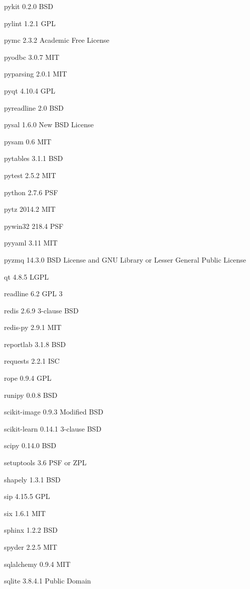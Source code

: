 \documentclass[letterpaper,10pt,openany,oneside]{sphinxmanual}
\begin{document}
\begin{DUlineblock}{0em}
\item[] pykit         0.2.0   BSD
\item[] pylint        1.2.1   GPL
\item[] pymc  2.3.2   Academic Free License
\item[] pyodbc        3.0.7   MIT
\item[] pyparsing     2.0.1   MIT
\item[] pyqt  4.10.4  GPL
\item[] pyreadline    2.0     BSD
\item[] pysal         1.6.0   New BSD License
\item[] pysam         0.6     MIT
\item[] pytables      3.1.1   BSD
\item[] pytest        2.5.2   MIT
\item[] python        2.7.6   PSF
\item[] pytz  2014.2  MIT
\item[] pywin32       218.4   PSF
\item[] pyyaml        3.11    MIT
\item[] pyzmq         14.3.0  BSD License and GNU Library or Lesser General Public License
\item[] qt    4.8.5   LGPL
\item[] readline      6.2     GPL 3
\item[] redis         2.6.9   3-clause BSD
\item[] redis-py      2.9.1   MIT
\item[] reportlab     3.1.8   BSD
\item[] requests      2.2.1   ISC
\item[] rope  0.9.4   GPL
\item[] runipy        0.0.8   BSD
\item[] scikit-image  0.9.3   Modified BSD
\item[] scikit-learn  0.14.1  3-clause BSD
\item[] scipy         0.14.0  BSD
\item[] setuptools    3.6     PSF or ZPL
\item[] shapely       1.3.1   BSD
\item[] sip   4.15.5  GPL
\item[] six   1.6.1   MIT
\item[] sphinx        1.2.2   BSD
\item[] spyder        2.2.5   MIT
\item[] sqlalchemy    0.9.4   MIT
\item[] sqlite        3.8.4.1         Public Domain

\end{DUlineblock}
\end{document}
